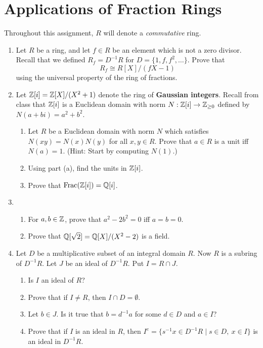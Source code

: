 \documentclass[../psets.tex]{subfiles}
\begin{document}
\section{Applications of Fraction Rings}
Throughout this assignment, $R$ will denote a \emph{commutative} ring.
\begin{enumerate}
    \item {}Let $R$ be a ring, and let $f\in R$ be an element which is not a zero divisor. Recall that we defined $R_f=D^{-1}R$ for $D=\{1,f,f^2,\dots\}$. Prove that
    \begin{equation*}
        R_f \cong R[X]/(fX-1)
    \end{equation*}
    using the universal property of the ring of fractions.
    \item Let $\mathbb{Z}[i]=\mathbb{Z}[X]/(X^2+1)$ denote the ring of \textbf{Gaussian integers}. Recall from class that $\mathbb{Z}[i]$ is a Euclidean domain with norm $N:\mathbb{Z}[i]\to{\mathbb{Z}_{\geq 0}}$ defined by $N(a+bi)=a^2+b^2$.
    \begin{enumerate}[label={(\alph*)}]
        \item Let $R$ be a Euclidean domain with norm $N$ which satisfies $N(xy)=N(x)N(y)$ for all $x,y\in R$. Prove that $a\in R$ is a unit iff $N(a)=1$. (Hint: Start by computing $N(1)$.)
        \item Using part (a), find the units in $\mathbb{Z}[i]$.
        \item Prove that $\operatorname{Frac}(\mathbb{Z}[i])=\mathbb{Q}[i]$.
    \end{enumerate}
    \item 
    \begin{enumerate}[label={(\alph*)}]
        \item For $a,b\in\mathbb{Z}$, prove that $a^2-2b^2=0$ iff $a=b=0$.
        \item Prove that $\mathbb{Q}[\sqrt{2}]=\mathbb{Q}[X]/(X^2-2)$ is a field.
    \end{enumerate}
    \item Let $D$ be a multiplicative subset of an integral domain $R$. Now $R$ is a subring of $D^{-1}R$. Let $J$ be an ideal of $D^{-1}R$. Put $I=R\cap J$.
    \begin{enumerate}[label={(\alph*)}]
        \item Is $I$ an ideal of $R$?
        \item Prove that if $I\neq R$, then $I\cap D=\emptyset$.
        \item Let $b\in J$. Is it true that $b=d^{-1}a$ for some $d\in D$ and $a\in I$?
        \item Prove that if $I$ is an ideal in $R$, then $I^e=\{s^{-1}x\in D^{-1}R\mid s\in D,\ x\in I\}$ is an ideal in $D^{-1}R$.

\end{enumerate}
\end{enumerate}
\end{document}
